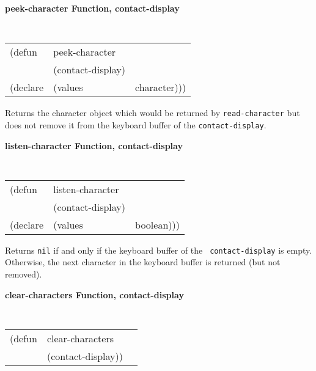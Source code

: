 {\samepage
{\large {\bf peek-character \hfill Function, contact-display}}
\begin{flushright} \parbox[t]{6.125in}{
\tt
\begin{tabular}{lll}
\raggedright
(defun & peek-character & \\
& (contact-display)\\
(declare &(values &character)))
\end{tabular}
\rm

}\end{flushright}}

\begin{flushright} \parbox[t]{6.125in}{
Returns the character object which would be returned by {\tt read-character} but does
not remove it from the keyboard buffer of the {\tt contact-display}.

}\end{flushright}



{\samepage
{\large {\bf listen-character \hfill Function, contact-display}}
\begin{flushright} \parbox[t]{6.125in}{
\tt
\begin{tabular}{lll}
\raggedright
(defun & listen-character & \\
& (contact-display)\\
(declare &(values &boolean)))
\end{tabular}
\rm

}\end{flushright}}

\begin{flushright} \parbox[t]{6.125in}{
Returns {\tt nil} if and only if the keyboard buffer of the {\tt
contact-display} is empty. Otherwise, the next character in the keyboard buffer
is returned (but not removed).

}\end{flushright}

{\samepage
{\large {\bf clear-characters \hfill Function, contact-display}}
\begin{flushright} \parbox[t]{6.125in}{
\tt
\begin{tabular}{lll}
\raggedright
(defun & clear-characters & \\
& (contact-display))
\end{tabular}
\rm

}\end{flushright}}

